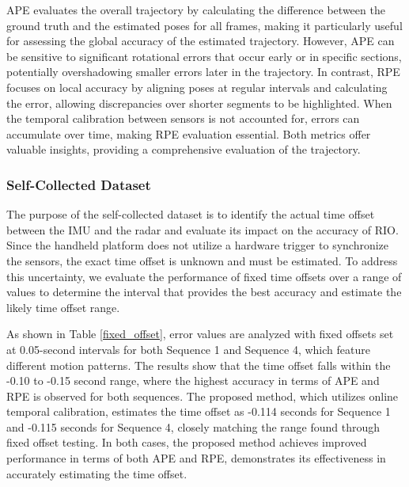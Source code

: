 APE evaluates the overall trajectory by calculating the difference between the ground truth and the estimated poses for all frames, making it particularly useful for assessing the global accuracy of the estimated trajectory. However, APE can be sensitive to significant rotational errors that occur early or in specific sections, potentially overshadowing smaller errors later in the trajectory. In contrast, RPE focuses on local accuracy by aligning poses at regular intervals and calculating the error, allowing discrepancies over shorter segments to be highlighted. When the temporal calibration between sensors is not accounted for, errors can accumulate over time, making RPE evaluation essential. Both metrics offer valuable insights, providing a comprehensive evaluation of the trajectory.

\subsubsection{Self-Collected Dataset}
The purpose of the self-collected dataset is to identify the actual time offset between the IMU and the radar and evaluate its impact on the accuracy of RIO. Since the handheld platform does not utilize a hardware trigger to synchronize the sensors, the exact time offset is unknown and must be estimated. To address this uncertainty, we evaluate the performance of fixed time offsets over a range of values to determine the interval that provides the best accuracy and estimate the likely time offset range.

As shown in Table \ref{fixed_offset}, error values are analyzed with fixed offsets set at 0.05-second intervals for both Sequence 1 and Sequence 4, which feature different motion patterns. The results show that the time offset falls within the -0.10 to -0.15 second range, where the highest accuracy in terms of APE and RPE is observed for both sequences. The proposed method, which utilizes online temporal calibration, estimates the time offset as -0.114 seconds for Sequence 1 and -0.115 seconds for Sequence 4, closely matching the range found through fixed offset testing. In both cases, the proposed method achieves improved performance in terms of both APE and RPE, demonstrates its effectiveness in accurately estimating the time offset.

